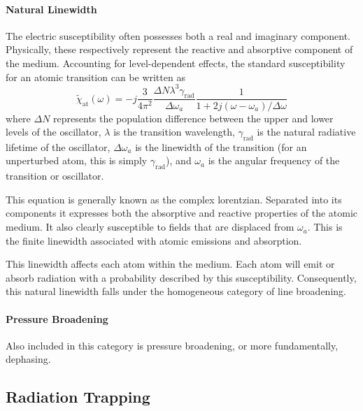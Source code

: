 \paragraph{Natural Linewidth}
The electric susceptibility often possesses both a real and imaginary component.
Physically, these respectively represent the reactive and absorptive component
of the medium. Accounting for level-dependent effects, the standard
susceptibility for an atomic transition can be written as
\begin{equation}
    \tilde{\chi}_\mathrm{at}(\omega) = -j\frac{3}{4\pi^2}\frac{\Delta
    N\lambda^3\gamma_\mathrm{rad}}{\Delta\omega_a}\frac{1}{1
    + 2j(\omega - \omega_a)/\Delta\omega}
\end{equation}
where $\Delta N$ represents the population difference between the upper and
lower levels of the oscillator, $\lambda$ is the transition wavelength,
$\gamma_\mathrm{rad}$ is the natural radiative lifetime of the oscillator,
$\Delta\omega_a$ is the linewidth of the transition (for an unperturbed
atom, this is simply $\gamma_\mathrm{rad}$), and $\omega_a$ is the
angular frequency of the transition or oscillator.

This equation is generally known as the complex lorentzian. Separated into its
components it expresses both the absorptive and reactive properties of the
atomic medium. It also clearly susceptible to fields that are displaced from
$\omega_a$. This is the finite linewidth associated with atomic
emissions and absorption.

This linewidth affects each atom within the medium. Each atom will emit or
absorb radiation with a probability described by this susceptibility.
Consequently, this natural linewidth falls under the homogeneous category of
line broadening.

\paragraph{Pressure Broadening}
Also included in this category is pressure broadening, or more fundamentally,
dephasing. 

\subsection{Radiation Trapping}
